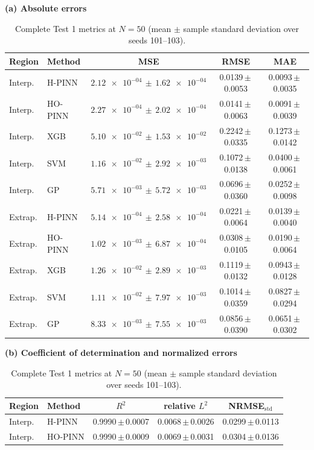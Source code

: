 \begin{table}[!htbp]
\centering
\small
\setlength{\tabcolsep}{3.2pt}
\caption{Complete Test 1 metrics at $N=50$ (mean $\pm$ sample standard deviation over seeds 101--103).}
\label{tab:test1_secondary}
\textbf{(a) Absolute errors}\par\smallskip
\begin{tabular}{llccc}
\toprule
Region & Method & MSE & RMSE & MAE \\
\midrule
Interp. & H-PINN & $\num{2.12e-04}\,\pm\,\num{1.62e-04}$ & 0.0139\,$\pm$\,0.0053 & 0.0093\,$\pm$\,0.0035 \\
Interp. & HO-PINN & $\num{2.27e-04}\,\pm\,\num{2.02e-04}$ & 0.0141\,$\pm$\,0.0063 & 0.0091\,$\pm$\,0.0039 \\
Interp. & XGB & $\num{5.10e-02}\,\pm\,\num{1.53e-02}$ & 0.2242\,$\pm$\,0.0335 & 0.1273\,$\pm$\,0.0142 \\
Interp. & SVM & $\num{1.16e-02}\,\pm\,\num{2.92e-03}$ & 0.1072\,$\pm$\,0.0138 & 0.0400\,$\pm$\,0.0061 \\
Interp. & GP & $\num{5.71e-03}\,\pm\,\num{5.72e-03}$ & 0.0696\,$\pm$\,0.0360 & 0.0252\,$\pm$\,0.0098 \\
\midrule
Extrap. & H-PINN & $\num{5.14e-04}\,\pm\,\num{2.58e-04}$ & 0.0221\,$\pm$\,0.0064 & 0.0139\,$\pm$\,0.0040 \\
Extrap. & HO-PINN & $\num{1.02e-03}\,\pm\,\num{6.87e-04}$ & 0.0308\,$\pm$\,0.0105 & 0.0190\,$\pm$\,0.0064 \\
Extrap. & XGB & $\num{1.26e-02}\,\pm\,\num{2.89e-03}$ & 0.1119\,$\pm$\,0.0132 & 0.0943\,$\pm$\,0.0128 \\
Extrap. & SVM & $\num{1.11e-02}\,\pm\,\num{7.97e-03}$ & 0.1014\,$\pm$\,0.0359 & 0.0827\,$\pm$\,0.0294 \\
Extrap. & GP & $\num{8.33e-03}\,\pm\,\num{7.55e-03}$ & 0.0856\,$\pm$\,0.0390 & 0.0651\,$\pm$\,0.0302 \\
\bottomrule
\end{tabular}
\par\medskip
\textbf{(b) Coefficient of determination and normalized errors}\par\smallskip
\begin{tabular}{llccc}
\toprule
Region & Method & $R^2$ & relative $L^2$ & NRMSE$_{\mathrm{std}}$ \\
\midrule
Interp. & H-PINN & 0.9990\,$\pm$\,0.0007 & 0.0068\,$\pm$\,0.0026 & 0.0299\,$\pm$\,0.0113 \\
Interp. & HO-PINN & 0.9990\,$\pm$\,0.0009 & 0.0069\,$\pm$\,0.0031 & 0.0304\,$\pm$\,0.0136 \\

\end{tabular}
\end{table}
